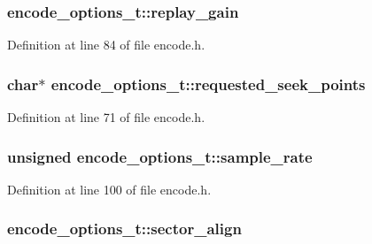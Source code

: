 \subsubsection[{\texorpdfstring{replay\+\_\+gain}{replay_gain}}]{ encode\+\_\+options\+\_\+t\+::replay\+\_\+gain}\hypertarget{structencode__options__t_a13cf9646a8026f97ee0cc351e54d90f7}{}\label{structencode__options__t_a13cf9646a8026f97ee0cc351e54d90f7}


Definition at line 84 of file encode.\+h.

\subsubsection[{\texorpdfstring{requested\+\_\+seek\+\_\+points}{requested_seek_points}}]{\setlength{\rightskip}{0pt plus 5cm}char$\ast$ encode\+\_\+options\+\_\+t\+::requested\+\_\+seek\+\_\+points}\hypertarget{structencode__options__t_aeed9855038c9a03db276967edc518993}{}\label{structencode__options__t_aeed9855038c9a03db276967edc518993}


Definition at line 71 of file encode.\+h.

\subsubsection[{\texorpdfstring{sample\+\_\+rate}{sample_rate}}]{\setlength{\rightskip}{0pt plus 5cm}unsigned encode\+\_\+options\+\_\+t\+::sample\+\_\+rate}\hypertarget{structencode__options__t_aaaeee0f4555dc61de05baf3a5dad24f0}{}\label{structencode__options__t_aaaeee0f4555dc61de05baf3a5dad24f0}


Definition at line 100 of file encode.\+h.

\subsubsection[{\texorpdfstring{sector\+\_\+align}{sector_align}}]{ encode\+\_\+options\+\_\+t\+::sector\+\_\+align}\hypertarget{structencode__options__t_a8be8aa269f841975ab566058cfbe664c}{}\label{structencode__options__t_a8be8aa269f841975ab566058cfbe664c}


